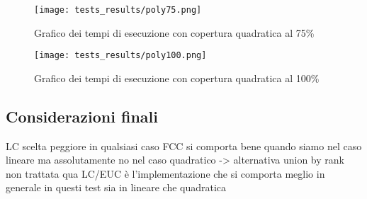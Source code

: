 \begin{figure}[!h]
    \begin{adjustbox}{center}
        \begin{minipage}{0.65\textwidth}
            \centering
            \captionsetup{justification=centering}
            \texttt{[image: tests\_results/poly75.png]}
            \caption{Grafico dei tempi di esecuzione con copertura quadratica al 75\%}
            \label{fig:poly75}
        \end{minipage}\hfill
        \begin{minipage}{0.65\textwidth}
            \centering
            \captionsetup{justification=centering}
            \texttt{[image: tests\_results/poly100.png]}
            \caption{Grafico dei tempi di esecuzione con copertura quadratica al 100\%}
            \label{fig:poly100}
        \end{minipage}
    \end{adjustbox}
\end{figure}
\newpage

\subsection{Considerazioni finali}

LC scelta peggiore in qualsiasi caso
FCC si comporta bene quando siamo nel caso lineare ma assolutamente no nel caso quadratico -> alternativa union by rank non trattata qua
LC/EUC è l'implementazione che si comporta meglio in generale in questi test sia in lineare che quadratica

